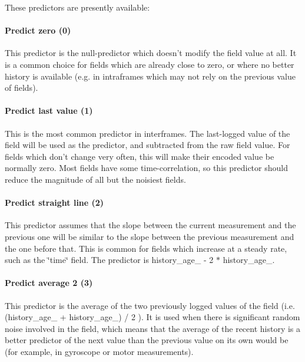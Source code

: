 These predictors are presently available\+:

\paragraph*{Predict zero (0)}

This predictor is the null-\/predictor which doesn't modify the field value at all. It is a common choice for fields which are already close to zero, or where no better history is available (e.\+g. in intraframes which may not rely on the previous value of fields).

\paragraph*{Predict last value (1)}

This is the most common predictor in interframes. The last-\/logged value of the field will be used as the predictor, and subtracted from the raw field value. For fields which don't change very often, this will make their encoded value be normally zero. Most fields have some time-\/correlation, so this predictor should reduce the magnitude of all but the noisiest fields.

\paragraph*{Predict straight line (2)}

This predictor assumes that the slope between the current measurement and the previous one will be similar to the slope between the previous measurement and the one before that. This is common for fields which increase at a steady rate, such as the \char`\"{}time\char`\"{} field. The predictor is {\ttfamily history\+\_\+age\+\_ -\/ 2 $\ast$ history\+\_\+age\+\_}.

\paragraph*{Predict average 2 (3)}

This predictor is the average of the two previously logged values of the field (i.\+e. {\ttfamily (history\+\_\+age\+\_ + history\+\_\+age\+\_) / 2} ). It is used when there is significant random noise involved in the field, which means that the average of the recent history is a better predictor of the next value than the previous value on its own would be (for example, in gyroscope or motor measurements).


